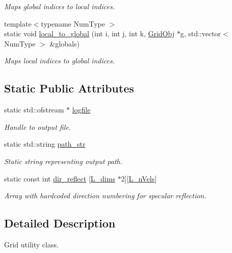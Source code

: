 \begin{DoxyCompactItemize}
\begin{DoxyCompactList}\small\item\em Maps global indices to local indices. \end{DoxyCompactList}\item 
{\footnotesize template$<$typename Num\+Type $>$ }\\static void \hyperlink{class_grid_utils_ac3e122b19b2ee0e159b3025b2858d895}{local\+\_\+to\+\_\+global} (int i, int j, int k, \hyperlink{class_grid_obj}{Grid\+Obj} $\ast$g, std\+::vector$<$ Num\+Type $>$ \&globals)
\begin{DoxyCompactList}\small\item\em Maps local indices to global indices. \end{DoxyCompactList}\end{DoxyCompactItemize}
\subsection*{Static Public Attributes}
\begin{DoxyCompactItemize}
\item 
static std\+::ofstream $\ast$ \hyperlink{class_grid_utils_a298239096e929c1ba4eba925e351c1b3}{logfile}
\begin{DoxyCompactList}\small\item\em Handle to output file. \end{DoxyCompactList}\item 
static std\+::string \hyperlink{class_grid_utils_a9b58748e9e05e84852962d7abc7942e3}{path\+\_\+str}
\begin{DoxyCompactList}\small\item\em Static string representing output path. \end{DoxyCompactList}\item 
static const int \hyperlink{class_grid_utils_a609ef43c9476067a52ee238cd3d594f2}{dir\+\_\+reflect} \mbox{[}\hyperlink{definitions_8h_a11cd469956bf6689c2bc034ee698e0b7}{L\+\_\+dims} $\ast$2\mbox{]}\mbox{[}\hyperlink{definitions_8h_a920e69a22e5f925675c5c77c521d586d}{L\+\_\+n\+Vels}\mbox{]}
\begin{DoxyCompactList}\small\item\em Array with hardcoded direction numbering for specular reflection. \end{DoxyCompactList}\end{DoxyCompactItemize}


\subsection{Detailed Description}
Grid utility class. 

